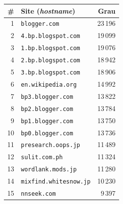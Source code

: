 \begin{tabular}{rlr}
\hline
\# & \textbf{Site (\textit{hostname})} & \textbf{Grau} \\ \hline
1 & \texttt{blogger.com} & 23\,196 \\
2 & \texttt{4.bp.blogspot.com} & 19\,099 \\
3 & \texttt{1.bp.blogspot.com} & 19\,076 \\
4 & \texttt{2.bp.blogspot.com} & 18\,942 \\
5 & \texttt{3.bp.blogspot.com} & 18\,906 \\
6 & \texttt{en.wikipedia.org} & 14\,992 \\
7 & \texttt{bp3.blogger.com} & 13\,822 \\
8 & \texttt{bp2.blogger.com} & 13\,784 \\
9 & \texttt{bp1.blogger.com} & 13\,750 \\
10 & \texttt{bp0.blogger.com} & 13\,736 \\
11 & \texttt{presearch.oops.jp} & 11\,489 \\
12 & \texttt{sulit.com.ph} & 11\,324 \\
13 & \texttt{wordlank.mods.jp} & 11\,280 \\
14 & \texttt{mixfind.whitesnow.jp} & 10\,230 \\
15 & \texttt{nnseek.com} & 9\,397 \\
\hline
\end{tabular}
